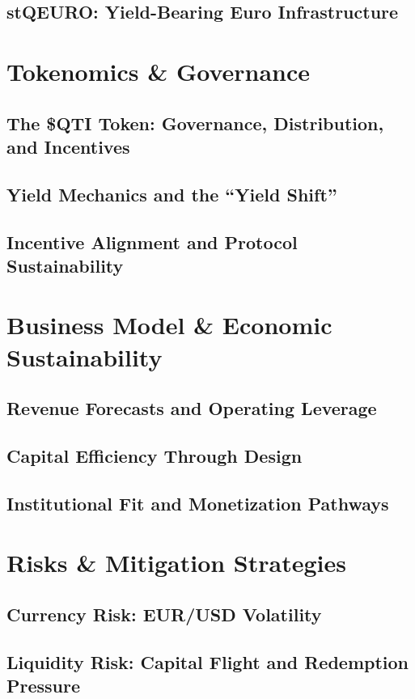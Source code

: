 \documentclass[12pt,a4paper]{report}
\begin{document}
\section{stQEURO: Yield-Bearing Euro Infrastructure}

\chapter{Tokenomics \& Governance}
\section{The \$QTI Token: Governance, Distribution, and Incentives}
\section{Yield Mechanics and the ``Yield Shift''}
\section{Incentive Alignment and Protocol Sustainability}

\chapter{Business Model \& Economic Sustainability}
\section{Revenue Forecasts and Operating Leverage}
\section{Capital Efficiency Through Design}
\section{Institutional Fit and Monetization Pathways}

\chapter{Risks \& Mitigation Strategies}
\section{Currency Risk: EUR/USD Volatility}
\section{Liquidity Risk: Capital Flight and Redemption Pressure}
\end{document}
